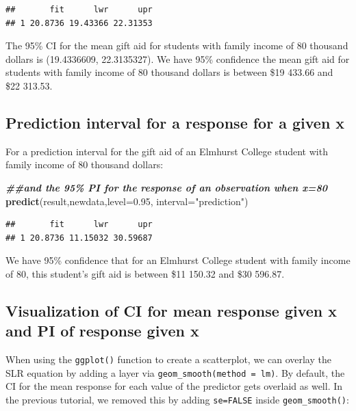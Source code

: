 \documentclass[
]{book}
\newenvironment{Shaded}{\begin{snugshade}}{\end{snugshade}}
\newcommand{\AttributeTok}[1]{\textcolor[rgb]{0.13,0.29,0.53}{#1}}
\newcommand{\DocumentationTok}[1]{\textcolor[rgb]{0.56,0.35,0.01}{\textbf{\textit{#1}}}}
\newcommand{\FloatTok}[1]{\textcolor[rgb]{0.00,0.00,0.81}{#1}}
\newcommand{\FunctionTok}[1]{\textcolor[rgb]{0.13,0.29,0.53}{\textbf{#1}}}
\newcommand{\NormalTok}[1]{#1}
\newcommand{\StringTok}[1]{\textcolor[rgb]{0.31,0.60,0.02}{#1}}
\begin{document}
\begin{verbatim}
##       fit      lwr      upr
## 1 20.8736 19.43366 22.31353
\end{verbatim}

The 95\% CI for the mean gift aid for students with family income of 80 thousand dollars is (19.4336609, 22.3135327). We have 95\% confidence the mean gift aid for students with family income of 80 thousand dollars is between \$19 433.66 and \$22 313.53.

\subsection*{Prediction interval for a response for a given x}\label{prediction-interval-for-a-response-for-a-given-x}

For a prediction interval for the gift aid of an Elmhurst College student with family income of 80 thousand dollars:

\begin{Shaded}
\begin{Highlighting}[]
\DocumentationTok{\#\#and the 95\% PI for the response of an observation when x=80}
\FunctionTok{predict}\NormalTok{(result,newdata,}\AttributeTok{level=}\FloatTok{0.95}\NormalTok{, }\AttributeTok{interval=}\StringTok{"prediction"}\NormalTok{)}
\end{Highlighting}
\end{Shaded}

\begin{verbatim}
##       fit      lwr      upr
## 1 20.8736 11.15032 30.59687
\end{verbatim}

We have 95\% confidence that for an Elmhurst College student with family income of 80, this student's gift aid is between \$11 150.32 and \$30 596.87.

\subsection*{Visualization of CI for mean response given x and PI of response given x}\label{visualization-of-ci-for-mean-response-given-x-and-pi-of-response-given-x}

When using the \texttt{ggplot()} function to create a scatterplot, we can overlay the SLR equation by adding a layer via \texttt{geom\_smooth(method\ =\ lm)}. By default, the CI for the mean response for each value of the predictor gets overlaid as well. In the previous tutorial, we removed this by adding \texttt{se=FALSE} inside \texttt{geom\_smooth()}:
\end{document}
